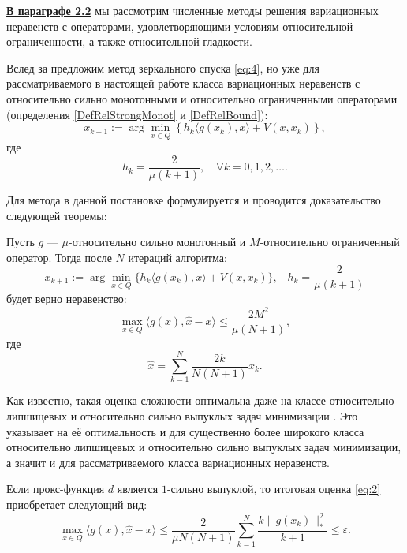 \underline{\textbf{В параграфе 2.2}} мы рассмотрим численные методы решения вариационных неравенств с операторами, удовлетворяющими условиям относительной ограниченности, а также относительной гладкости.

Вслед за \cite{Bach_2012} предложим метод зеркального спуска \eqref{eq:4}, но уже для рассматриваемого в настоящей работе класса  вариационных неравенств с относительно сильно монотонными и относительно ограниченными операторами (определения \ref{DefRelStrongMonot} и \ref{DefRelBound}):
\begin{equation} \label{eq:4}
    x_{k+1} := \arg \min_{x \in Q} \left\{ h_k \langle g(x_k), x \rangle + V(x, x_k)\right\},
\end{equation}
где
$$
    h_k = \frac{2}{\mu(k+1)},\quad  \forall k= 0,1, 2, \ldots.
$$

Для метода в данной постановке формулируется и проводится доказательство следующей теоремы:
\begin{theorem}\label{thm_MD_VI}
    Пусть $g$ --- $\mu$-относительно сильно монотонный и $M$-относительно ограниченный оператор. Тогда после $N$ итераций алгоритма: 
    $$ 
        x_{k+1} := \arg \min_{x \in Q} \{ h_k \langle g(x_k), x\rangle + V(x, x_k)\}, \;\;\; h_k = \frac{2}{\mu (k+1)}
    $$
    будет верно неравенство:
    \begin{equation}\label{eq:2}
        \max_{x \in Q} \langle g(x), \widehat{x} - x\rangle \leq \frac{2 M^2}{\mu (N+1)},
    \end{equation}
    где 
    $$
        \widehat{x} = \sum_{k=1}^{N} \frac{2 k}{N (N+1)} x_k.
    $$
\end{theorem}
Как известно, такая оценка сложности оптимальна даже на классе относительно липшицевых и относительно сильно выпуклых задач минимизации \cite{Lu_2018}. Это указывает на её оптимальность и для существенно более широкого класса относительно липшицевых и относительно сильно выпуклых задач минимизации, а значит и для рассматриваемого класса вариационных неравенств. 

\begin{remark} \label{remark4}
    Если прокс-функция $d$ является $1$-сильно выпуклой, то итоговая оценка \eqref{eq:2} приобретает следующий вид:
    \begin{equation}
        \max_{x \in Q} \langle g(x), \widehat{x} - x \rangle \leq \frac{2}{\mu N (N+1)} \sum_{k=1}^{N} \frac{k \|g(x_k)\|_*^2}{k+1} \leq \varepsilon.
    \end{equation}
\end{remark}

